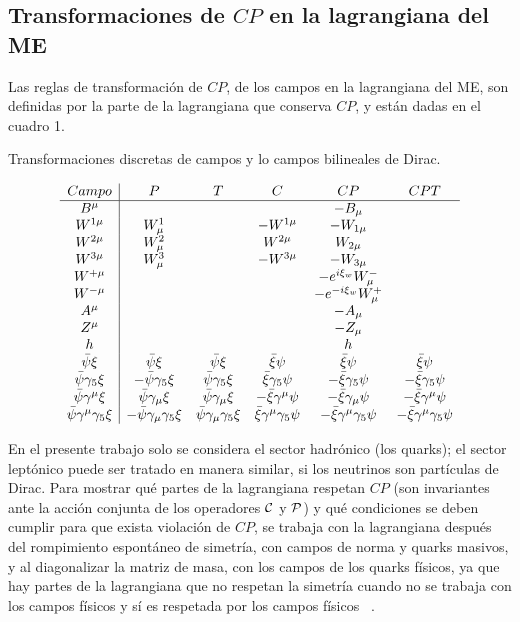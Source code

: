 \subsection{Transformaciones de $CP$ en la lagrangiana del ME}
Las reglas de transformaci\'on de $CP$, de los campos en la lagrangiana del ME, 
son definidas por la parte de la lagrangiana que conserva $CP$, y est\'an dadas 
en el cuadro 1.
\begin{table}[h!]\label{t1}
\caption{Transformaciones discretas de campos y lo campos bilineales de Dirac.}
$$\ba{c|ccccc}
Campo & P & T & C & CP & CPT\\ \hline
B^{\mu}&  &   &   & -B_{\mu}& \\
W^{1\mu}&W^1_{\mu}& & -W^{1\mu} & -W_{1\mu} & \\
W^{2\mu}&W^2_{\mu}& & W^{2\mu} & W_{2\mu} & \\
W^{3\mu}&W^3_{\mu}& & -W^{3\mu} & -W_{3\mu} & \\
W^{+\mu}& &   &   & -e^{i\xi_w}W^-_{\mu} & \\
W^{-\mu}& &   &   & -e^{-i\xi_w}W^+_{\mu} & \\
A^{\mu}&  &   &   & -A_{\mu}& \\
Z^{\mu} & &   &   & -Z_{\mu} & \\
h       & &   &   & h        & \\
\bar\psi\xi & \bar\psi\xi & \bar\psi\xi & \bar\xi\psi & \bar\xi\psi & 
\bar\xi\psi\\

\bar\psi\gamma_5\xi & -\bar\psi\gamma_5\xi & \bar\psi\gamma_5\xi & \bar\xi\gamma
_5\psi & -\bar\xi\gamma_5\psi & -\bar\xi\gamma_5\psi\\

\bar\psi\gamma^{\mu}\xi & \bar\psi\gamma_{\mu}\xi & \bar\psi\gamma_{\mu}\xi & 
-\bar\xi\gamma^{\mu}\psi & -\bar\xi\gamma_{\mu}\psi & -\bar\xi\gamma^{\mu}\psi\\

\bar\psi\gamma^{\mu}\gamma_5\xi & -\bar\psi\gamma_{\mu}\gamma_5\xi & \bar\psi
\gamma_{\mu}\gamma_5\xi & \bar\xi\gamma^{\mu}\gamma_5\psi & -\bar\xi\gamma^{\mu}
\gamma_5\psi & -\bar\xi\gamma^{\mu}\gamma_5\psi\\ %
\ea $$\end{table}

En el presente trabajo solo se considera el sector hadr\'onico (los quarks); el 
sector lept\'onico puede ser tratado en manera similar, si los neutrinos son 
part\'iculas de Dirac. Para mostrar qu\'e  partes de la lagrangiana respetan
$CP$ (son invariantes ante la acci\'on conjunta de los operadores ${\cal C}$ y
${\cal P}$) y qu\'e condiciones se deben cumplir para que exista violaci\'on de 
$CP$, se trabaja con la lagrangiana despu\'es del rompimiento espont\'aneo de 
simetr\'ia, con campos de norma y quarks masivos, y al diagonalizar la matriz de
masa, con los campos de los quarks f\'isicos, ya que hay partes de la 
lagrangiana que no respetan la simetr\'ia cuando no se trabaja con los campos 
f\'isicos y s\'i es respetada por los campos f\'isicos ~\cite{Ber199701}. 

